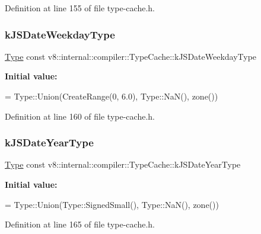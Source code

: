 Definition at line 155 of file type-\/cache.\+h.

\mbox{\label{classv8_1_1internal_1_1compiler_1_1TypeCache_a664d92a094309f3fa800abb0df7e664e}} 
\subsubsection{\texorpdfstring{k\+J\+S\+Date\+Weekday\+Type}{kJSDateWeekdayType}}
{\footnotesize\ttfamily \mbox{\hyperlink{classv8_1_1internal_1_1compiler_1_1Type}{Type}} const v8\+::internal\+::compiler\+::\+Type\+Cache\+::k\+J\+S\+Date\+Weekday\+Type}

{\bfseries Initial value\+:}
\begin{DoxyCode}
=
      Type::Union(CreateRange(0, 6.0), Type::NaN(), zone())
\end{DoxyCode}


Definition at line 160 of file type-\/cache.\+h.

\mbox{\label{classv8_1_1internal_1_1compiler_1_1TypeCache_a7cefd3e422c24e34803edd8ad134de57}} 
\subsubsection{\texorpdfstring{k\+J\+S\+Date\+Year\+Type}{kJSDateYearType}}
{\footnotesize\ttfamily \mbox{\hyperlink{classv8_1_1internal_1_1compiler_1_1Type}{Type}} const v8\+::internal\+::compiler\+::\+Type\+Cache\+::k\+J\+S\+Date\+Year\+Type}

{\bfseries Initial value\+:}
\begin{DoxyCode}
=
      Type::Union(Type::SignedSmall(), Type::NaN(), zone())
\end{DoxyCode}


Definition at line 165 of file type-\/cache.\+h.

